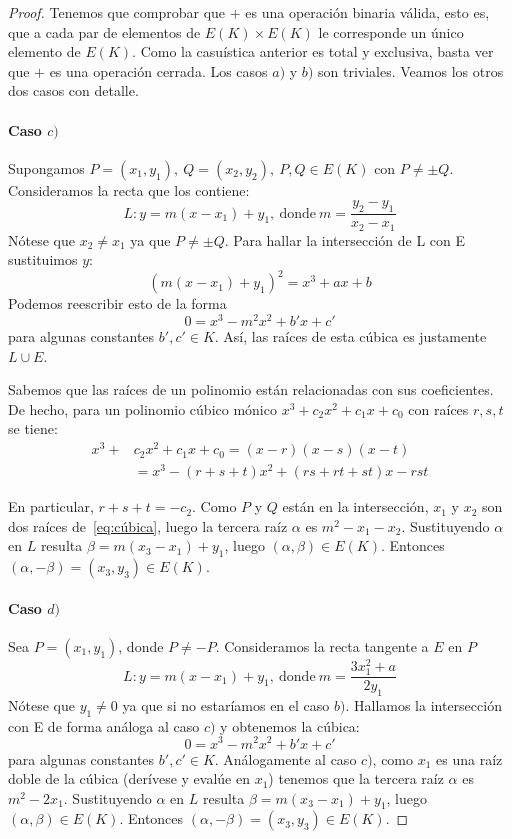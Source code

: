 \begin{proof}
Tenemos que comprobar que $+$ es una operación binaria válida, esto es, que a cada par de elementos de $E(K) \times E(K)$ le corresponde un único elemento de $E(K)$. Como la casuística anterior es total y exclusiva, basta ver que $+$ es una operación cerrada. Los casos $a)$ y $b)$ son triviales. Veamos los otros dos casos con detalle.

\paragraph{Caso $c)$}
Supongamos $P = (x_1, y_1),\ Q = (x_2, y_2),\ P, Q \in E(K)$ con $P \neq \pm Q$. Consideramos la recta que los contiene:
$$
	L: y = m(x - x_1) + y_1,\ \text{donde}\ m = \frac{y_2 - y_1}{x_2 - x_1}
$$
Nótese que $x_2 \neq x_1$ ya que $P \neq \pm Q$. Para hallar la intersección de L con E sustituimos $y$:
$$
	(m(x - x_1) + y_1)^2 = x^3 + a x + b
$$
Podemos reescribir esto de la forma
\begin{equation}
\label{eq:cúbica}
	0 = x^3 - m^2 x^2 + b' x + c'
\end{equation}
para algunas constantes $b', c' \in K$. Así, las raíces de esta cúbica es justamente $L \cup E$.

Sabemos que las raíces de un polinomio están relacionadas con sus coeficientes. De hecho, para un polinomio cúbico mónico $x^3 + c_2 x^2 + c_1 x + c_0$ con raíces $r, s, t$ se tiene:
\begin{align*}
	x^3 + &c_2 x^2 + c_1 x + c_0 = (x-r)(x-s)(x-t) \\
	&= x^3 - (r + s + t)x^2 + (r s + r t + s t)x - r s t
\end{align*}

En particular, $r + s + t = -c_2$. Como $P$ y $Q$ están en la intersección, $x_1$ y $x_2$ son dos raíces de~\eqref{eq:cúbica}, luego la tercera raíz $\alpha$ es $m^2 - x_1 - x_2$. Sustituyendo $\alpha$ en $L$ resulta $\beta = m(x_3 - x_1) + y_1$, luego $(\alpha, \beta) \in E(K)$. Entonces  $(\alpha, -\beta) = (x_3, y_3) \in E(K)$.

\paragraph{Caso $d)$}
Sea $P = (x_1, y_1)$, donde $P \neq -P$. Consideramos la recta tangente a $E$ en $P$
$$
	L: y = m(x - x_1) + y_1,\ \text{donde}\ m = \frac{3 x_1^2 + a}{2 y_1}
$$
Nótese que $y_1 \neq 0$ ya que si no estaríamos en el caso $b)$. Hallamos la intersección con E de forma análoga al caso $c)$ y obtenemos la cúbica:
$$
	0 = x^3 - m^2 x^2 + b' x + c'
$$
para algunas constantes $b', c' \in K$. Análogamente al caso $c)$, como $x_1$ es una raíz doble de la cúbica (derívese y evalúe en $x_1$) tenemos que la tercera raíz $\alpha$ es $m^2 - 2 x_1$. Sustituyendo $\alpha$ en $L$ resulta $\beta = m(x_3 - x_1) + y_1$, luego $(\alpha, \beta) \in E(K)$. Entonces  $(\alpha, -\beta) = (x_3, y_3) \in E(K)$.
\end{proof}

